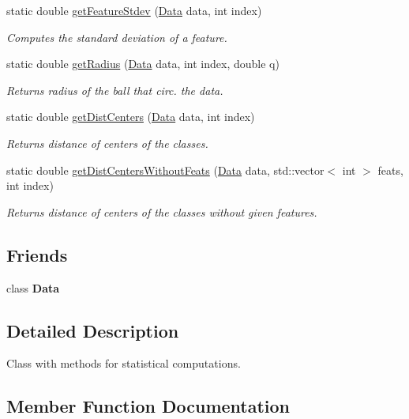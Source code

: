 \begin{DoxyCompactItemize}
static double \hyperlink{class_statistics_a4cd8cbff1c0b3cdf08adf6c7fc453251}{get\+Feature\+Stdev} (\hyperlink{class_data}{Data} data, int index)
\begin{DoxyCompactList}\small\item\em Computes the standard deviation of a feature. \end{DoxyCompactList}\item 
static double \hyperlink{class_statistics_ac6fd43364deef34396204503b90bf792}{get\+Radius} (\hyperlink{class_data}{Data} data, int index, double q)
\begin{DoxyCompactList}\small\item\em Returns radius of the ball that circ. the data. \end{DoxyCompactList}\item 
static double \hyperlink{class_statistics_a9150c8c61b5c5255d448e9e3ed387c73}{get\+Dist\+Centers} (\hyperlink{class_data}{Data} data, int index)
\begin{DoxyCompactList}\small\item\em Returns distance of centers of the classes. \end{DoxyCompactList}\item 
static double \hyperlink{class_statistics_a705f3b85e91f08f926670c6602fffda6}{get\+Dist\+Centers\+Without\+Feats} (\hyperlink{class_data}{Data} data, std\+::vector$<$ int $>$ feats, int index)
\begin{DoxyCompactList}\small\item\em Returns distance of centers of the classes without given features. \end{DoxyCompactList}\end{DoxyCompactItemize}
\subsection*{Friends}
\begin{DoxyCompactItemize}
\item 
\mbox{\label{class_statistics_a242d9fdd7c3ba48097582a2662b6f48d}} 
class {\bfseries Data}
\end{DoxyCompactItemize}


\subsection{Detailed Description}
Class with methods for statistical computations. 

\subsection{Member Function Documentation}
\mbox{\label{class_statistics_a9150c8c61b5c5255d448e9e3ed387c73}} 
